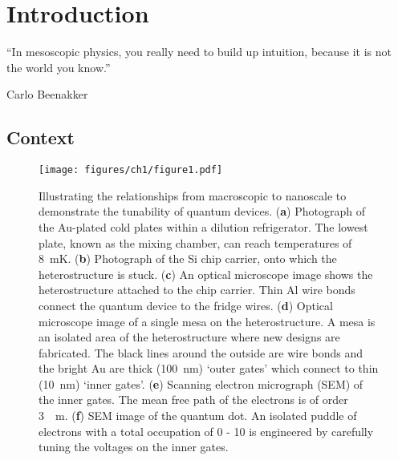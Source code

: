 \chapter{Introduction}\label{cha:intro}
\epigraph{``In mesoscopic physics, you really need to build up intuition, because it is not the world you know.''}{Carlo Beenakker~\cite{beenaker_quote}}



\section{Context}

\begin{figure}[!htb]
 \begin{center}
 \texttt{[image: figures/ch1/figure1.pdf]}
 \caption[Fridge to Quantum Dot Scale Illustration]{\label{fig:ch1/scale_breakdown} 
Illustrating the relationships from macroscopic to nanoscale to demonstrate the tunability of quantum devices. (\textbf{a}) Photograph of the Au-plated cold plates within a dilution refrigerator. The lowest plate, known as the mixing chamber, can reach temperatures of \qty{8}{mK}. (\textbf{b}) Photograph of the Si chip carrier, onto which the heterostructure is stuck. (\textbf{c}) An optical microscope image shows the heterostructure attached to the chip carrier. Thin Al wire bonds connect the quantum device to the fridge wires. (\textbf{d}) Optical microscope image of a single mesa on the heterostructure. A mesa is an isolated area of the heterostructure where new designs are fabricated. The black lines around the outside are wire bonds and the bright Au are thick (\qty{100}{nm}) `outer gates' which connect to thin (\qty{10}{nm}) `inner gates'. (\textbf{e}) Scanning electron micrograph (SEM) of the inner gates. The mean free path of the electrons is of order \qty{3}{\mu m}. (\textbf{f}) SEM image of the quantum dot. An isolated puddle of electrons with a total occupation of 0 - 10 is engineered by carefully tuning the voltages on the inner gates. 
  }
 \end{center}
\end{figure}




